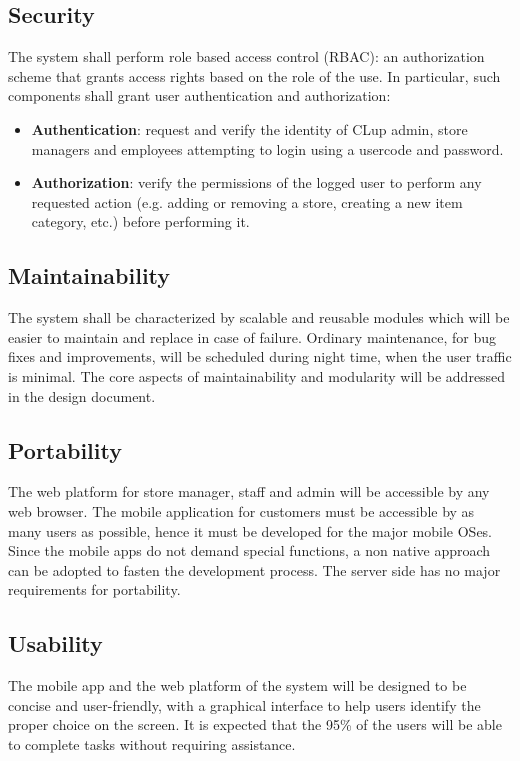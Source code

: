 \subsection{Security}
The system shall perform role based access control (RBAC): an authorization scheme that grants access rights based on the role of the use. In particular, such components shall grant user authentication and authorization:
\begin{itemize}
    \item \textbf{Authentication}: request and verify the identity of CLup admin, store managers and employees attempting to login using a usercode and password.
    \item \textbf{Authorization}: verify the permissions of the logged user to perform any requested action (e.g. adding or removing a store, creating a new item category, etc.) before performing it.
\end{itemize}

\subsection{Maintainability}
The system shall be characterized by scalable and reusable modules which will be easier to maintain and replace in case of failure. Ordinary maintenance, for bug fixes and improvements, will be scheduled during night time, when the user traffic is minimal.\newline
The core aspects of maintainability and modularity will be addressed in the design document.

\subsection{Portability}
The web platform for store manager, staff and admin will be accessible by any web browser.\newline
The mobile application for customers must be accessible by as many users as possible, hence it must be developed for the major mobile OSes. Since the mobile apps do not demand special functions, a non native approach can be adopted to fasten the development process.
The server side has no major requirements for portability.

\subsection{Usability}
The mobile app and the web platform of the system will be designed to be concise and user-friendly, with a graphical interface to help users identify the proper choice on the screen. It is expected that the 95\% of the users will be able to complete tasks without requiring assistance.


